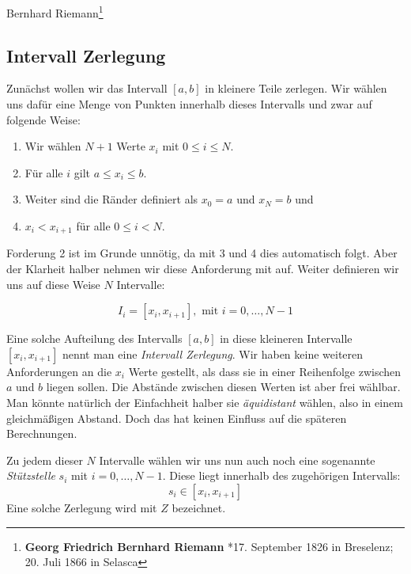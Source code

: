 Bernhard Riemann\footnote{\textbf{Georg Friedrich Bernhard Riemann} *17. September 1826 in Breselenz; 20. Juli 1866 in Selasca} 

\subsection{Intervall Zerlegung}

\begin{definition}\label{def:zerlegung}
Zunächst wollen wir das Intervall $[a,b]$ in kleinere Teile zerlegen. Wir wählen uns dafür eine Menge von Punkten innerhalb dieses Intervalls und zwar auf folgende Weise:

\begin{enumerate}
\item Wir wählen $N+1$ Werte $x_i$ mit $0\le i \le N$.
\item Für alle $i$ gilt $a\le x_i \le b$.
\item Weiter sind die Ränder definiert als $x_0=a$ und $x_N=b$ und
\item $x_i < x_{i+1}$ für alle $0\le i < N$.
\end{enumerate}
Forderung 2 ist im Grunde unnötig, da mit 3 und 4 dies automatisch folgt. Aber der Klarheit halber nehmen wir diese Anforderung mit auf. Weiter definieren wir uns auf diese Weise $N$ Intervalle:

\begin{equation}
I_i = [x_i,x_{i+1}], \text{ mit } i=0, \dots , N-1
\end{equation}
\end{definition}

Eine solche Aufteilung des Intervalls $[a,b]$ in diese kleineren Intervalle $[x_i,x_{i+1}]$ nennt man eine \emph{Intervall Zerlegung}. Wir haben keine weiteren Anforderungen an die $x_i$ Werte gestellt, als dass sie in einer Reihenfolge zwischen $a$ und $b$ liegen sollen. Die Abstände zwischen diesen Werten ist aber frei wählbar. Man könnte natürlich der Einfachheit halber sie \emph{äquidistant} wählen, also in einem gleichmäßigen Abstand. Doch das hat keinen Einfluss auf die späteren Berechnungen. 

\begin{definition}
Zu jedem dieser $N$ Intervalle wählen wir uns nun auch noch eine sogenannte \emph{Stützstelle} $s_i$ mit $i=0, \dots , N-1$. Diese liegt innerhalb des zugehörigen Intervalls:
\begin{equation}
s_i \in [x_i,x_{i+1}]
\end{equation}
Eine solche Zerlegung wird mit $Z$ bezeichnet.
\end{definition}

